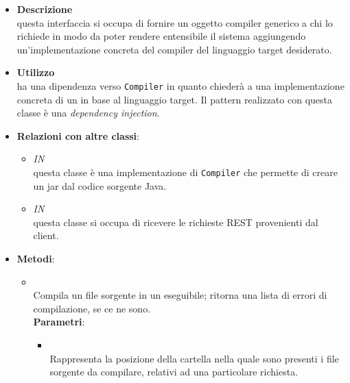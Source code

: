 \begin{itemize}
\item \textbf{Descrizione}\\
questa interfaccia si occupa di fornire un oggetto compiler generico a chi lo richiede in modo da poter rendere entensibile il sistema aggiungendo un'implementazione concreta del compiler del linguaggio target desiderato.
\item \textbf{Utilizzo}\\
 ha una dipendenza verso \texttt{Compiler} in quanto chiederà a  una implementazione concreta di un  in base al linguaggio target. Il pattern realizzato con questa classe è una \emph{dependency injection}.
\item \textbf{Relazioni con altre classi}:
\begin{itemize}
\item \textit{IN} \hyperref[\nogloxy{swedesigner::server::compiler::java::JavaCompiler}]{}\\
questa classe è una implementazione di \texttt{Compiler} che permette di creare un jar dal codice sorgente Java.
\item \textit{IN} \hyperref[\nogloxy{swedesigner::server::controller::RequestHandlerController}]{}\\
questa classe si occupa di ricevere le richieste REST provenienti dal client.
\end{itemize}
\item \textbf{Metodi}:
\begin{itemize}
\item {}
\\ Compila un file sorgente in un eseguibile; ritorna una lista di errori di compilazione, se ce ne sono.
\\ \textbf{Parametri}:
\begin{itemize}
\item {}
\\ Rappresenta la posizione della cartella nella quale sono presenti i file sorgente da compilare, relativi ad una particolare richiesta.
\end{itemize}
\end{itemize}
\end{itemize}
\subsection{}
\label{\nogloxy{swedesigner::server::compiler::java}}
